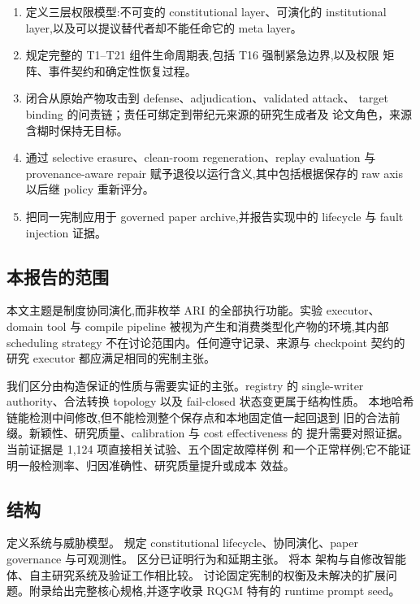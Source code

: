 \begin{enumerate}
  \item 定义三层权限模型:不可变的 constitutional layer、可演化的
        institutional layer,以及可以提议替代者却不能任命它的 meta layer。
  \item 规定完整的 T1--T21 组件生命周期表,包括 T16 强制紧急边界,以及权限
        矩阵、事件契约和确定性恢复过程。
  \item 闭合从原始产物攻击到 defense、adjudication、validated attack、
        target binding 的问责链；责任可绑定到带纪元来源的研究生成者及
        论文角色，来源含糊时保持无目标。
  \item 通过 selective erasure、clean-room regeneration、replay evaluation
        与 provenance-aware repair 赋予退役以运行含义,其中包括根据保存的
        raw axis 以后继 policy 重新评分。
  \item 把同一宪制应用于 governed paper archive,并报告实现中的 lifecycle
        与 fault injection 证据。
\end{enumerate}

\subsection{本报告的范围}\label{sec:intro:scope}

本文主题是制度协同演化,而非枚举 ARI 的全部执行功能。实验 executor、
domain tool 与 compile pipeline 被视为产生和消费类型化产物的环境,其内部
scheduling strategy 不在讨论范围内。任何遵守记录、来源与 checkpoint
契约的研究 executor 都应满足相同的宪制主张。

我们区分由构造保证的性质与需要实证的主张。registry 的 single-writer
authority、合法转换 topology 以及 fail-closed 状态变更属于结构性质。
本地哈希链能检测中间修改,但不能检测整个保存点和本地固定值一起回退到
旧的合法前缀。新颖性、研究质量、calibration 与 cost effectiveness 的
提升需要对照证据。当前证据是 1,124 项直接相关试验、五个固定故障样例
和一个正常样例;它不能证明一般检测率、归因准确性、研究质量提升或成本
效益。

\subsection{结构}\label{sec:intro:organisation}

 定义系统与威胁模型。 规定
constitutional lifecycle、协同演化、paper governance 与可观测性。
 区分已证明行为和延期主张。 将本
架构与自修改智能体、自主研究系统及验证工作相比较。
讨论固定宪制的权衡及未解决的扩展问题。附录给出完整核心规格,并逐字收录
RQGM 特有的 runtime prompt seed。
